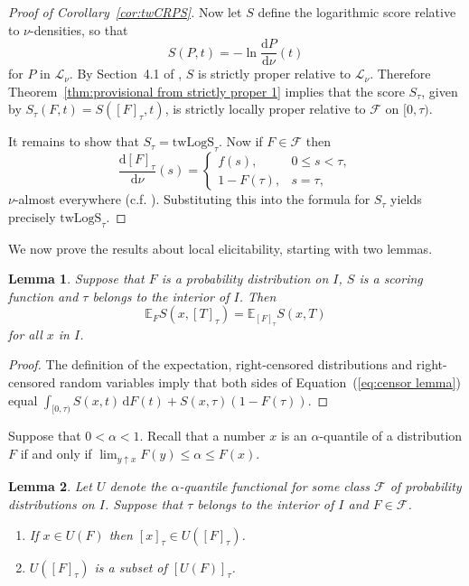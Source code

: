 \documentclass[10pt]{article} %
\theoremstyle{theorem}
\newtheorem{lem}{Lemma}
\theoremstyle{definition}
\newcommand{\EEE}{\mathbb{E}}
\newcommand{\dd}{\mathrm{d}}
\newcommand{\twLogS}{\mathrm{twLogS}}
\begin{document}
\begin{proof}[Proof of Corollary~\ref{cor:twCRPS}]
Now let $S$ define the logarithmic score relative to $\nu$-densities, so that
\[
S(P, t) = -\ln \frac{\dd P}{\dd \nu}(t)
\]
for $P$ in $\mathcal{L}_\nu$. By Section~4.1 of \citet{gneiting2007strictly}, $S$ is strictly proper relative to $\mathcal{L}_\nu$. Therefore Theorem~\ref{thm:provisional from strictly proper 1} implies that the score $S_\tau$, given by $S_\tau(F,t)=S([F]_\tau,t)$, is strictly locally proper relative to $\mathcal{F}$ on $[0,\tau)$.

It remains to show that $S_\tau=\twLogS_\tau$. Now if $F\in\mathcal{F}$ then
\[
\frac{\dd[F]_\tau}{\dd \nu}(s) = \begin{cases}f(s), & 0\leq s < \tau, \\ 1 - F(\tau), & s=\tau, \end{cases}
\]
$\nu$-almost everywhere (c.f. \citealt[Section~B.1]{de2025localizing}). Substituting this into the formula for $S_\tau$ yields precisely $\twLogS_\tau$.
\end{proof}

We now prove the results about local elicitability, starting with two lemmas.

\begin{lem}\label{lem:censor}
Suppose that $F$ is a probability distribution on $I$, $S$ is a scoring function and $\tau$ belongs to the interior of $I$. Then
\begin{equation}\label{eq:censor lemma}
\EEE_F S(x, [T]_\tau) = \EEE_{[F]_\tau}S(x,T) 
\end{equation}
for all $x$ in $I$.
\end{lem}

\begin{proof}
The definition of the expectation, right-censored distributions and right-censored random variables imply that both sides of Equation~(\ref{eq:censor lemma}) equal $\int_{[0,\tau)}S(x,t)\,\dd F(t) + S(x,\tau)(1-F(\tau))$.
\end{proof}

Suppose that $0<\alpha<1$. Recall that a number $x$ is an $\alpha$-quantile of a distribution $F$ if and only if $\lim_{y\uparrow x} F(y) \leq \alpha \leq F(x)$.

\begin{lem}\label{lem:quantile censoring}
Let $U$ denote the $\alpha$-quantile functional for some class $\mathcal{F}$ of probability distributions on $I$. Suppose that $\tau$ belongs to the interior of $I$ and $F\in\mathcal{F}$.
\begin{enumerate}
\item[(a)] If $x\in U(F)$ then $[x]_\tau \in U([F]_\tau)$.
\item[(b)] $U([F]_\tau)$ is a subset of $[U(F)]_\tau$.
\end{enumerate}
\end{lem}
\end{document}
